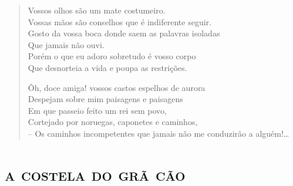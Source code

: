\begin{verse}
Vossos olhos são um mate costumeiro.\\
Vossas mãos são conselhos que é indiferente seguir.\\
Gosto da vossa boca donde saem as palavras isoladas\\
Que jamais não ouvi.\\
Porém o que eu adoro sobretudo é vosso corpo\\
Que desnorteia a vida e poupa as restrições.

Ôh, doce amiga! vossos castos espelhos de aurora\\
Despejam sobre mim paisagens e paisagens\\
Em que passeio feito um rei sem povo,\\
Cortejado por noruegas, caponetes e caminhos,\\
-- Os caminhos incompetentes que jamais não me conduzirão a alguém!\ldots{}\\
\end{verse}


\part{\textsc{a costela do grã cão}}
\removeepigraph


